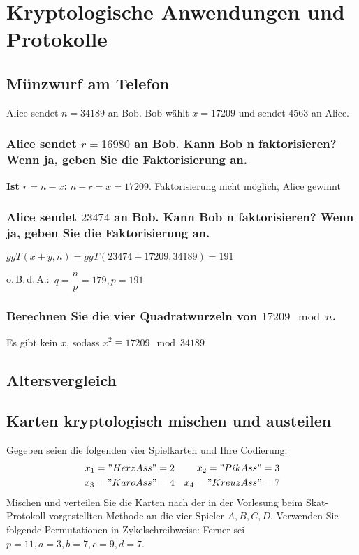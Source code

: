 \section{Kryptologische Anwendungen und Protokolle}

\subsection{Münzwurf am Telefon}
Alice sendet $n = 34189$ an Bob. Bob wählt $x = 17209$ und sendet $4563$ an Alice.
\subsubsection{Alice sendet $r = 16980$ an Bob. Kann Bob n faktorisieren? Wenn ja, geben Sie die
Faktorisierung an.}

\textbf{Ist $r=n-x$:} $n-r=x = 17209$. Faktorisierung nicht möglich, Alice gewinnt

\subsubsection{Alice sendet $23474$ an Bob. Kann Bob n faktorisieren? Wenn ja, geben Sie die
Faktorisierung an.}

$ggT(x+y,n) = ggT(23474+17209, 34189) = 191$

o.\,B.\,d.\,A.:~$q = \dfrac{n}{p} = 179, p = 191$ 

\subsubsection{Berechnen Sie die vier Quadratwurzeln von $17209 \mod n$.}

Es gibt kein $x$, sodass $x^2 \equiv 17209 \mod 34189$


\subsection{Altersvergleich}
\subsection{Karten kryptologisch mischen und austeilen}
Gegeben seien die folgenden vier Spielkarten und Ihre Codierung:
\begin{align}
x_1="Herz Ass" &= 2  &     x_2="Pik Ass"  &= 3 \\
x_3="Karo Ass" &= 4  &     x_4="Kreuz Ass"&= 7
\end{align}
Mischen und verteilen Sie die Karten nach der in der Vorlesung beim Skat-Protokoll
vorgestellten Methode an die vier Spieler $A, B, C, D$.
Verwenden Sie folgende Permutationen in Zykelschreibweise:
Ferner sei $p=11, a=3, b=7, c=9, d=7$.


